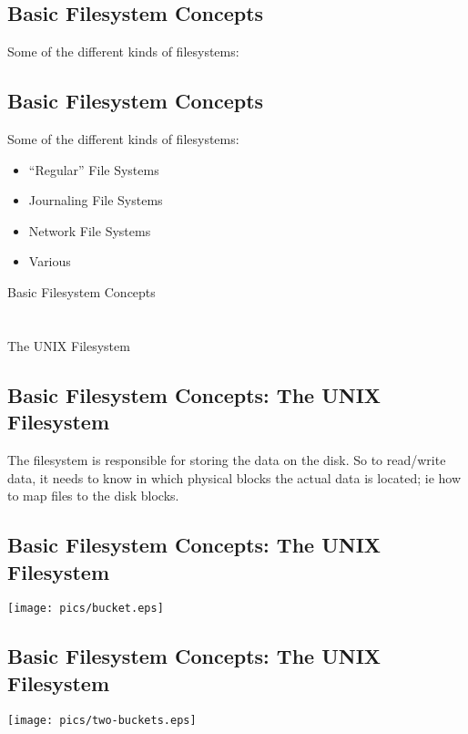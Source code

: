 \documentclass[xga]{xdvislides}
\begin{document}
\subsection{Basic Filesystem Concepts}
Some of the different kinds of filesystems:

\subsection{Basic Filesystem Concepts}
Some of the different kinds of filesystems:
\begin{itemize}
	\item ``Regular'' File Systems
	\item Journaling File Systems
	\item Network File Systems
	\item Various
\end{itemize}

\newpage
\vspace*{\fill}
\begin{center}
	\Hugesize
		Basic Filesystem Concepts\\ [1em]
	\hspace*{5mm}
	\blueline\\
	\hspace*{5mm}\\
		The UNIX Filesystem
\end{center}
\vspace*{\fill}

\subsection{Basic Filesystem Concepts: The UNIX Filesystem}
The filesystem is responsible for storing the data on the disk.
So to read/write data, it needs to know in which physical blocks the actual
data is located; ie how to map files to the disk blocks.


\subsection{Basic Filesystem Concepts: The UNIX Filesystem}
\vspace*{\fill}
\begin{center}
\texttt{[image: pics/bucket.eps]} \\
\end{center}
\vspace*{\fill}

\subsection{Basic Filesystem Concepts: The UNIX Filesystem}
\begin{center}
\texttt{[image: pics/two-buckets.eps]} \\
\end{center}
\end{document}
